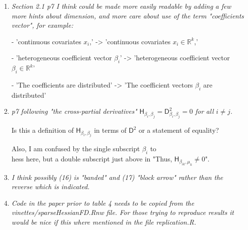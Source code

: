 \documentclass{article}
\newcommand{\parD}[3]{\mathsf{D}^{#1}_{#2}#3}
\newcommand{\hess}[2]{\mathsf{H}_{#1}#2}
\newcommand{\Real}[1]{\mathbb{R}^{#1}}
\newenvironment{revQuote}{\itshape}{\vspace{\baselineskip}}
\newenvironment{response}{\normalfont}{\vspace{\baselineskip}}
\begin{document}
\begin{enumerate}
\begin{response}
\end{response}

\item \begin{revQuote}
Section 2.1 p7 I think could be made more easily readable by adding a few
more hints about dimension, and more care about use of the term 
"coefficients vector", for example:

  - 'continuous covariates $x_i$,' -> 'continuous covariates $x_i \in
\Real{k}$,'

  - 'heterogeneous coefficient vector $\beta_i$' -> 'heterogeneous
coefficient vector $\beta_i \in \Real{k}$'

  - 'The coefficients are distributed' -> 'The coefficient vectors
$\beta_i$ are distributed'


    
  \end{revQuote}

\begin{response}
  
\end{response}


\item \begin{revQuote}
p7 following "the cross-partial derivatives"
$\hess{\beta_i,\beta_j}{}=\parD{2}{\beta_i, \beta_j}{}=0$ for all $i\neq
j$.  

  Is this a definition of $\hess{\beta_i,\beta_j}{}$ in terms of  $\parD{2}{}{}$
or a statement of equality?
  
  Also, I am confused by the single subscript $\beta_i$ to \\hess here, but a
double subscript just above in "Thus, $\hess{\beta_{ik},\mu_k}{}\neq 0$".
  \end{revQuote}

\begin{response}
  
\end{response}


\item \begin{revQuote}
 I think possibly (16) is "banded" and (17) "block arrow" rather than the
reverse which is indicated.
  \end{revQuote}

\begin{response}
  
\end{response}


\item \begin{revQuote}
Code in the paper prior to table 4 needs to be copied from the
vinettes/sparseHessianFD.Rnw file. For those trying to reproduce results it
would be nice if this where mentioned in the file replication.R.
  \end{revQuote}


\end{enumerate}
\end{document}
